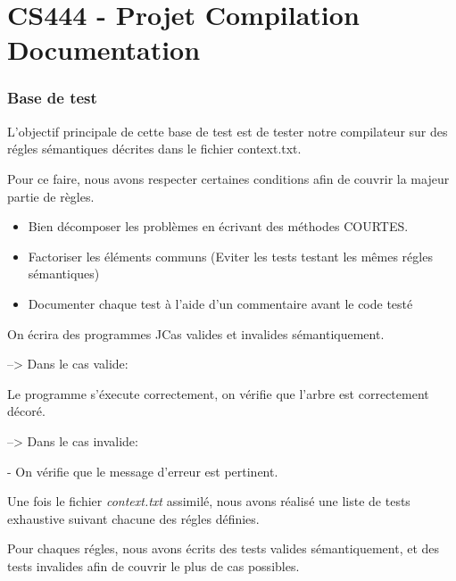 \part*{CS444 - Projet Compilation \\ Documentation}


\section*{Base de test}

    L'objectif principale de cette base de test est de tester notre compilateur
    sur des régles sémantiques décrites dans le fichier context.txt.

    \vspace{3mm}

    Pour ce faire, nous avons respecter certaines conditions afin de couvrir
    la majeur partie de règles.

    \vspace{3mm}

    \begin{itemize}
        \item Bien décomposer les problèmes en écrivant des méthodes COURTES.
        \item Factoriser les éléments communs (Eviter les tests testant les mêmes régles sémantiques)
        \item Documenter chaque test à l'aide d'un commentaire avant le code testé
    \end{itemize}

    \vspace{3mm}

    On écrira des programmes JCas valides et invalides sémantiquement.

    \vspace{3mm}

       --> Dans le cas valide:

    \tab   Le programme s'éxecute correctement, on vérifie que l'arbre
            est correctement décoré.

    \vspace{3mm}

        --> Dans le cas invalide:

    \tab     - On vérifie que le message d'erreur est pertinent.

    \vspace{10mm}

    Une fois le fichier \emph{context.txt} assimilé, nous avons réalisé une liste
    de tests exhaustive suivant chacune des régles définies.

    \vspace{3mm}

    Pour chaques régles, nous avons écrits des tests valides sémantiquement, et des
    tests invalides afin de couvrir le plus de cas possibles.

    \vspace{3mm}

    
